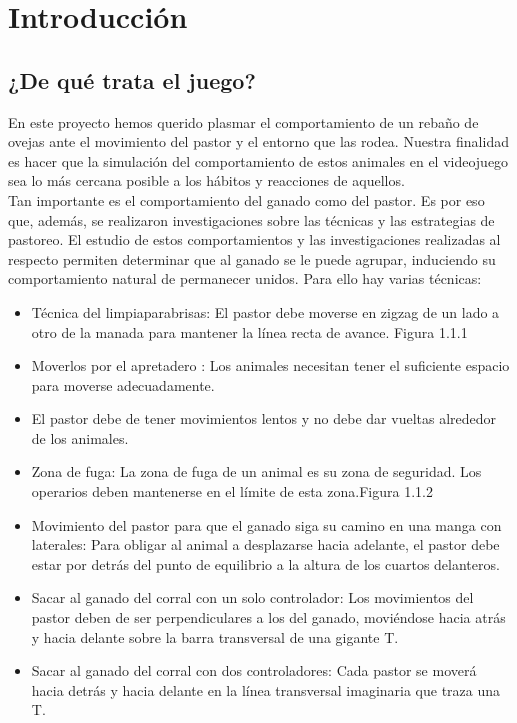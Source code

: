 \section{Introducción}
\label{sec:introduccion}

\subsection{¿De qué trata el juego?}
\label{subsubsection:intro_juego}

En este proyecto hemos querido plasmar el comportamiento de un rebaño de ovejas ante el movimiento del pastor y el entorno que las rodea. 
Nuestra finalidad es hacer que la simulación del comportamiento de estos animales en el videojuego sea lo más cercana posible a los hábitos 
y reacciones de aquellos. \\

Tan importante es el comportamiento del ganado como del pastor. Es por eso que, además, se realizaron investigaciones sobre las técnicas y 
las estrategias de pastoreo. El estudio de estos comportamientos y las investigaciones realizadas al respecto permiten determinar que al 
ganado se le puede agrupar, induciendo su comportamiento natural de permanecer unidos. Para ello hay varias técnicas:

\begin{itemize}
 \item Técnica del limpiaparabrisas: El pastor debe moverse en zigzag de un lado a otro de la manada para mantener la línea recta de avance. Figura 1.1.1

 \item Moverlos por el apretadero : Los animales necesitan tener el suficiente espacio para moverse adecuadamente.

 \item El pastor debe de tener movimientos lentos y no debe dar vueltas alrededor de los animales.

 \item Zona de fuga: La zona de fuga de un animal es su zona de seguridad. Los operarios deben mantenerse en el límite de esta zona.Figura 1.1.2

 \item Movimiento del pastor para que el ganado siga su camino en una manga con laterales: Para obligar al animal a desplazarse hacia adelante, el pastor debe estar por detrás del punto de equilibrio a la altura de los cuartos delanteros.

 \item Sacar al ganado del corral con un solo controlador: Los movimientos del pastor deben de ser perpendiculares a los del ganado, moviéndose hacia atrás y hacia delante sobre la barra transversal de una gigante T.

 \item Sacar al ganado del corral con dos controladores:  Cada pastor se moverá hacia detrás y hacia delante en la línea transversal imaginaria que traza una T.
\end{itemize}

